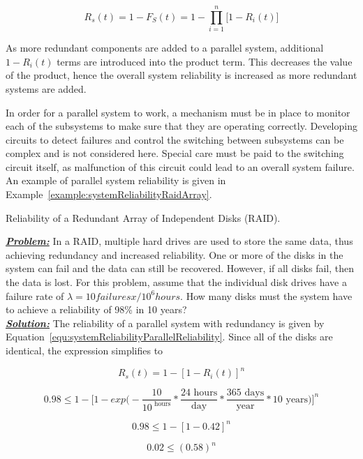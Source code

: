 {\begin{equation}
\label{equ:systemReliabilityParallelReliability}
R_s(t) = 1-F_S(t) = 1 - \prod_{i=1}^n \big[ 1-R_i(t) \big]
\end{equation}

As more redundant components are added to a parallel system, additional
$1-R_i(t)$ terms are introduced into the
product term. This decreases the value of the product, hence the overall
system reliability is increased as more redundant systems are added.

In order for a parallel system to work, a mechanism must be in place to
monitor each of the subsystems to make sure that they are operating
correctly. Developing circuits to detect failures and control the
switching between subsystems can be complex and is not considered here.
Special care must be paid to the switching circuit itself, as
malfunction of this circuit could lead to an overall system failure. An
example of parallel system reliability is given in 
Example~\ref{example:systemReliabilityRaidArray}.


\begin{example}{Reliability of a Redundant Array of Independent Disks (RAID).}
\label{example:systemReliabilityRaidArray}

\emph{\textbf{\ul{Problem:}}} In a RAID, multiple hard drives are used
to store the same data, thus achieving redundancy and increased
reliability. One or more of the disks in the system can fail and the
data can still be recovered. However, if all disks fail, then the data
is lost. For this problem, assume that the individual disk drives have a
failure rate of $\lambda = 10 failuresx/10^6 hours$. How many disks
must the system have to achieve a reliability of 98\% in 10 years?\\

\noindent\emph{\textbf{\ul{Solution:}}} The reliability of a parallel system with
redundancy is given by Equation~\ref{equ:systemReliabilityParallelReliability}. 
Since all of the disks are identical, the expression simplifies to

$$R_s(t) = 1 - \left[ 1 - R_i(t) \right]^n$$

$$0.98 \leq 1 - \big[ 1 - exp\big( - \frac {10}{10^ \text{ hours}} * \frac{24 \text{ hours}}{\text{day}} * \frac{365 \text{ days}}{\text{year}} * 10 \text{ years} \big) \big]^n$$

$$0.98 \leq 1 - \left[1-0.42\right]^n$$

$$0.02 \leq (0.58)^n$$


\end{example}}
